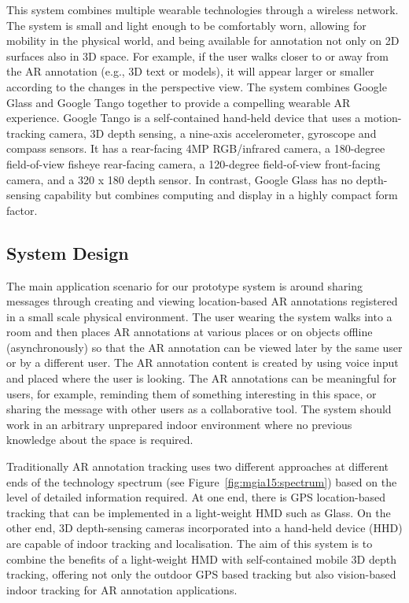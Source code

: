This system combines multiple wearable technologies through a wireless network. The system is small and light enough to be comfortably worn, allowing for mobility in the physical world, and being available for annotation not only on 2D surfaces also in 3D space. For example, if the user walks closer to or away from the AR annotation (e.g., 3D text or models), it will appear larger or smaller according to the changes in the perspective view. The system combines Google Glass and Google Tango together to provide a compelling wearable AR experience. Google Tango is a self-contained hand-held device that uses a motion-tracking camera, 3D depth sensing, a nine-axis accelerometer, gyroscope and compass sensors. It has a rear-facing 4MP RGB/infrared camera, a 180-degree field-of-view fisheye rear-facing camera, a 120-degree field-of-view front-facing camera, and a 320 x 180 depth sensor. In contrast, Google Glass has no depth-sensing capability but combines computing and display in a highly compact form factor. 



\subsection{System Design}

The main application scenario for our prototype system is around sharing messages through creating and viewing location-based AR annotations registered in a small scale physical environment. The user wearing the system walks into a room and then places AR annotations at various places or on objects offline (asynchronously) so that the AR annotation can be viewed later by the same user or by a different user. The AR annotation content is created by using voice input and placed where the user is looking. The AR annotations can be meaningful for users, for example, reminding them of something interesting in this space, or sharing the message with other users as a collaborative tool. The system should work in an arbitrary unprepared indoor environment where no previous knowledge about the space is required. 

Traditionally AR annotation tracking uses two different approaches at different ends of the technology spectrum (see Figure~\ref{fig:mgia15:spectrum}) based on the level of detailed information required. At one end, there is GPS location-based tracking that can be implemented in a light-weight HMD such as Glass. On the other end, 3D depth-sensing cameras incorporated into a hand-held device (HHD) are capable of indoor tracking and localisation. The aim of this system is to combine the benefits of a light-weight HMD with self-contained mobile 3D depth tracking, offering not only the outdoor GPS based tracking but also vision-based indoor tracking for AR annotation applications. 

